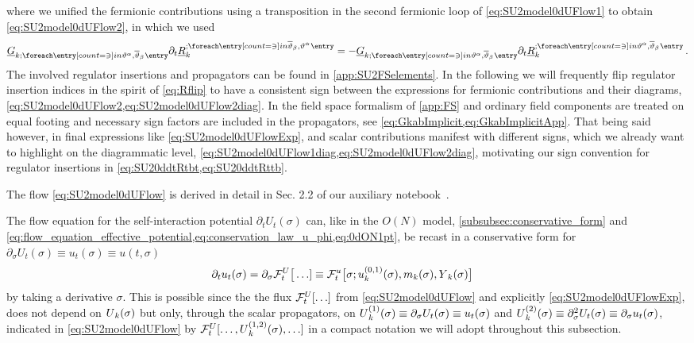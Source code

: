 where we unified the fermionic contributions using a transposition in the second fermionic loop of \cref{eq:SU2model0dUFlow1} to obtain
\cref{eq:SU2model0dUFlow2}, in which we used
\begin{align}
\FSpropagatorArg{\FSGEoM}{\vartheta^{\alpha},\overline{\vartheta}_{\beta}}\partial_t\FSregulatorArg{\FSREoM}{\overline{\vartheta}_{\beta},\vartheta^{\alpha}}=-\FSpropagatorArg{\FSGEoM}{\vartheta^{\alpha},\overline{\vartheta}_{\beta}}\partial_t\FSregulatorArg{\FSREoM}{\vartheta^{\alpha},\overline{\vartheta}_{\beta}}\, .\label{eq:Rflip}
\end{align}
The involved regulator insertions and propagators can be found in \cref{app:SU2FSelements}.
In the following we will frequently flip \gmv{} regulator insertion indices in the spirit of \cref{eq:Rflip} to have a consistent sign between the expressions for fermionic contributions and their diagrams, \cf{} \cref{eq:SU2model0dUFlow2,eq:SU2model0dUFlow2diag}.
In the field space formalism of \cref{app:FS} \gmv{} and ordinary field components are treated on equal footing and necessary sign factors are included in the propagators, see \cref{eq:GkabImplicit,eq:GkabImplicitApp}.
That being said however, in final expressions like \cref{eq:SU2model0dUFlowExp}, \gmv{} and scalar contributions manifest with different signs, which we already want to highlight on the diagrammatic level, \cf{} \cref{eq:SU2model0dUFlow1diag,eq:SU2model0dUFlow2diag}, motivating our sign convention for \gmv{} regulator insertions in \cref{eq:SU20ddtRtbt,eq:SU20ddtRttb}.

The flow \cref{eq:SU2model0dUFlow} is derived in detail in Sec. 2.2 of our auxiliary notebook~\cite{Steil:2023zeroDSU2}.\bigskip

The flow equation for the \rgscaledependent{} self-interaction potential $\partial_t U_t(\sigma)$ can, like in the $O(N)$ model, \cf{} \cref{subsubsec:conservative_form} and \cref{eq:flow_equation_effective_potential,eq:conservation_law_u_phi,eq:0dON1pt}, be recast in a conservative form for $\partial_\sigma U_t(\sigma)\equiv u_t(\sigma)\equiv u(t,\sigma)$
\begin{align}
\partial_t u_t(\sigma)&= \partial_\sigma \FRGflow_t^U\big[\ldots] \equiv \FRGflow_t^u\big[\sigma;\FScoupling{u}{0,1}{\sigma},\FScoupling{m}{0}{\sigma},\FScoupling{Y}{0}{\sigma}\big] 
\label{eq:SU2model0duFlow}
\end{align}
by taking a derivative \wrt{} $\sigma$.
This is possible since the the \frg{} flux $\mathcal{F}_t^U[\ldots]$ from \cref{eq:SU2model0dUFlow} and explicitly \eqref{eq:SU2model0dUFlowExp}, does not depend on $\FScoupling{U}{0}{\sigma}$ but only, through the scalar propagators, on $\FScoupling{U}{1}{\sigma}\equiv \partial_\sigma U_t(\sigma)\equiv u_t(\sigma)$ and $\FScoupling{U}{2}{\sigma}\equiv \partial_\sigma^2 U_t(\sigma)\equiv \partial_\sigma u_t(\sigma)$, indicated in \cref{eq:SU2model0dUFlow} by $\FRGflow_t^U[\ldots,\FScoupling{U}{1,2}{\sigma},\ldots]$ in a compact notation we will adopt throughout this subsection.

